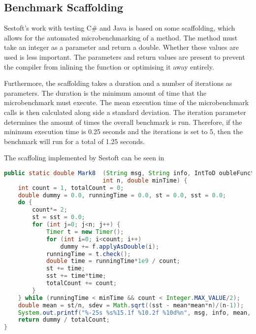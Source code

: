 \subsection{Benchmark Scaffolding} \label{sec:sestoft-scaffolding}
Sestoft's  work with testing C\# and Java is based on some scaffolding, which allows for the automated microbenchmarking of a method. The method must take an integer as a parameter and return a double. Whether these values are used is less important. The parameters and return values are present to prevent the compiler from inlining the function or optimising it away entirely.

Furthermore, the scaffolding takes a duration and a number of iterations as parameters. The duration is the minimum amount of time that the microbenchmark must execute. The mean execution time of the microbenchmark calls is then calculated along side a standard deviation. The iteration parameter determines the amount of times the overall benchmark is run. Therefore, if the minimum execution time is 0.25 seconds and the iterations is set to 5, then the benchmark will run for a total of 1.25 seconds.

The scaffoling implemented by Sestoft can be seen in 
\begin{lstlisting}[language=Java, style=java-highlight, caption={Sestoft's Scaffolding \cite{sestoft2013microbenchmarks}}, label=lst:sestoft]
public static double Mark8  (String msg, String info, IntToD oubleFunction f,
                            int n, double minTime) {
    int count = 1, totalCount = 0;
    double dummy = 0.0, runningTime = 0.0, st = 0.0, sst = 0.0;
    do {
        count*= 2;
        st = sst = 0.0;
        for (int j=0; j<n; j++) {
            Timer t = new Timer();
            for (int i=0; i<count; i++)
                dummy += f.applyAsDouble(i);
            runningTime = t.check();
            double time = runningTime*1e9 / count;
            st += time;
            sst += time*time;
            totalCount += count;
        }
    } while (runningTime < minTime && count < Integer.MAX_VALUE/2);
    double mean = st/n, sdev = Math.sqrt((sst - mean*mean*n)/(n-1));
    System.out.printf("%-25s %s%15.1f %10.2f %10d%n", msg, info, mean, sdev, count);
    return dummy / totalCount;
}
\end{lstlisting}

